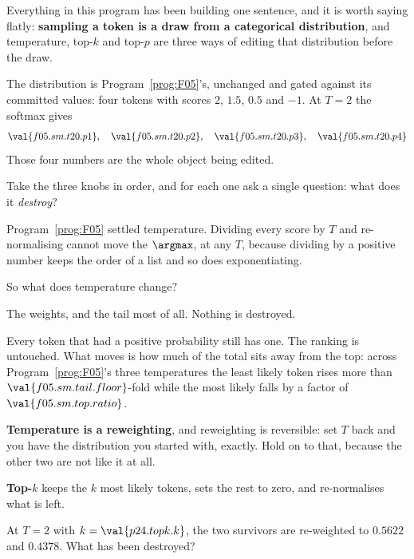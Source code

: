 \begin{fr}
Everything in this program has been building one sentence, and it is worth
saying flatly: \textbf{sampling a token is a draw from a categorical
distribution}, and temperature, top-$k$ and top-$p$ are three ways of editing
that distribution before the draw.

The distribution is Program~\ref{prog:F05}'s, unchanged and gated against its
committed values: four tokens with scores $2$, $\num{1.5}$, $\num{0.5}$ and
$-1$. At $T = 2$ the softmax gives
\[ \val{f05.sm.t20.p1},\quad \val{f05.sm.t20.p2},\quad
   \val{f05.sm.t20.p3},\quad \val{f05.sm.t20.p4} \]
Those four numbers are the whole object being edited.
\end{fr}

\begin{fr}
Take the three knobs in order, and for each one ask a single question: what
does it \emph{destroy}?

Program~\ref{prog:F05} settled temperature. Dividing every score by $T$ and
re-normalising cannot move the $\argmax$, at any $T$, because dividing by a
positive number keeps the order of a list and so does exponentiating.

So what does temperature change?
\dotline
\nextframe
\end{fr}

\begin{fr}
\begin{ansblock}
The weights, and the tail most of all. Nothing is destroyed.
\end{ansblock}

Every token that had a positive probability still has one. The ranking is
untouched. What moves is how much of the total sits away from the top: across
Program~\ref{prog:F05}'s three temperatures the least likely token rises more
than $\val{f05.sm.tail.floor}$-fold while the most likely falls by a factor of
$\val{f05.sm.top.ratio}$.

\textbf{Temperature is a reweighting}, and reweighting is reversible: set $T$
back and you have the distribution you started with, exactly. Hold on to that,
because the other two are not like it at all.
\end{fr}

\begin{fr}
\textbf{Top-$k$} keeps the $k$ most likely tokens, sets the rest to zero, and
re-normalises what is left.

At $T = 2$ with $k = \val{p24.topk.k}$, the two survivors are re-weighted to
$\num{0.5622}$ and $\num{0.4378}$. What has been destroyed?
\dotline
\nextframe
\end{fr}

